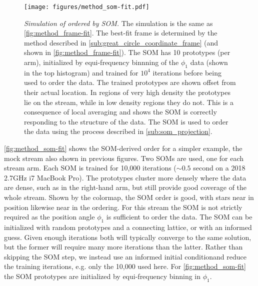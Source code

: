 \documentclass[fleqn,usenatbib]{mnras}
\begin{document}
      \begin{figure}
        \centering
        \texttt{[image: figures/method\_som-fit.pdf]}
        \caption{ \emph{Simulation of  ordered by SOM.} The
           simulation is the same as
          \autoref{fig:method_frame-fit}. The best-fit frame is determined by
          the method described in \autoref{sub:great_circle_coordinate_frame}
          (and shown in \autoref{fig:method_frame-fit}). The SOM has 10
          prototypes (per arm), initialized by equi-frequency binnning of the
          $\phi_1$ data (shown in the top histogram) and trained for $10^4$
          iterations before being used to order the data. The trained prototypes
          are shown offset from their actual location. In regions of very high
          density the prototypes lie on the stream, while in low density regions
          they do not. This is a consequence of local averaging and shows the
          SOM is correctly responding to the structure of the data. The SOM is
          used to order the data using the process described in
          \autoref{sub:som_projection}. }
        \label{fig:method_som-fit}
      \end{figure}

      \autoref{fig:method_som-fit} shows the SOM-derived order for a simpler
      example, the mock  stream also shown in previous figures.
      Two SOMs are used, one for each stream arm. Each SOM is trained for 10,000
      iterations ($\sim0.5$ second on a 2018 2.7GHz i7 MacBook Pro). The
      prototypes cluster more densely where the data are dense, such as in the
      right-hand arm, but still provide good coverage of the whole stream. Shown
      by the colormap, the SOM order is good, with stars near in position
      likewise near in the ordering. For this stream the SOM is not strictly
      required as the position angle $\phi_1$ is sufficient to order the data.
      The SOM can be initialized with random prototypes and a connecting
      lattice, or with an informed guess. Given enough iterations both will
      typically converge to the same solution, but the former will require many
      more iterations than the latter. Rather than skipping the SOM step, we
      instead use an informed initial condition\footnotemark and reduce the
      training iterations, e.g. only the 10,000 used here. For
      \autoref{fig:method_som-fit} the SOM prototypes are initialized by
      equi-frequency binning in $\phi_1$.
\end{document}
